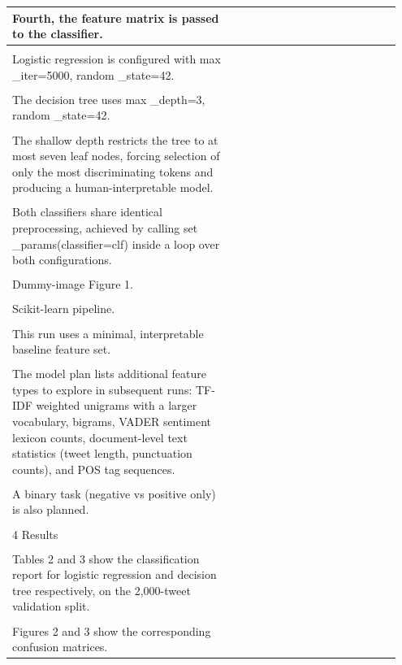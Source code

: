 \documentclass[11pt]{article}
\begin{document}
\begin{longtable}{|p{0.55\linewidth}|p{0.40\linewidth}|}
\hline
Fourth, the feature matrix is passed to the classifier. & \\[2pt]
\hline
\rule{0pt}{3.5cm} & \\
\hline
Logistic regression is configured with max \_iter=5000, random \_state=42. & \\[2pt]
\hline
\rule{0pt}{3.5cm} & \\
\hline
The decision tree uses max \_depth=3, random \_state=42. & \\[2pt]
\hline
\rule{0pt}{3.5cm} & \\
\hline
The shallow depth restricts the tree to at most seven leaf nodes, forcing selection of only the most discriminating tokens and producing a human-interpretable model. & \\[2pt]
\hline
\rule{0pt}{3.5cm} & \\
\hline
Both classifiers share identical preprocessing, achieved by calling set \_params(classifier=clf) inside a loop over both configurations. & \\[2pt]
\hline
\rule{0pt}{3.5cm} & \\
\hline
Dummy-image Figure 1. & \\[2pt]
\hline
\rule{0pt}{3.5cm} & \\
\hline
Scikit-learn pipeline. & \\[2pt]
\hline
\rule{0pt}{3.5cm} & \\
\hline
This run uses a minimal, interpretable baseline feature set. & \\[2pt]
\hline
\rule{0pt}{3.5cm} & \\
\hline
The model plan lists additional feature types to explore in subsequent runs: TF-IDF weighted unigrams with a larger vocabulary, bigrams, VADER sentiment lexicon counts, document-level text statistics (tweet length, punctuation counts), and POS tag sequences. & \\[2pt]
\hline
\rule{0pt}{3.5cm} & \\
\hline
A binary task (negative vs positive only) is also planned. & \\[2pt]
\hline
\rule{0pt}{3.5cm} & \\
\hline
4 Results & \\[2pt]
\hline
\rule{0pt}{3.5cm} & \\
\hline
Tables 2 and 3 show the classification report for logistic regression and decision tree respectively, on the 2,000-tweet validation split. & \\[2pt]
\hline
\rule{0pt}{3.5cm} & \\
\hline
Figures 2 and 3 show the corresponding confusion matrices. & \\[2pt]

\end{longtable}
\end{document}
